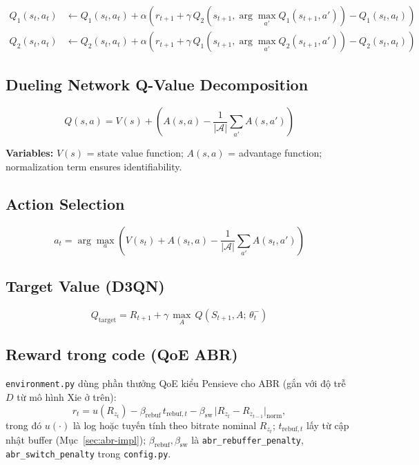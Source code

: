 \documentclass[11pt,a4paper]{article}
\begin{document}
\begin{align}
  Q_1(s_t, a_t) &\leftarrow Q_1(s_t,a_t) + \alpha\!\left(
    r_{t+1} + \gamma\, Q_2\!\left(s_{t+1}, \arg\max_{a'} Q_1(s_{t+1},a')\right)
    - Q_1(s_t,a_t)\right)
  \tag{D3QN-a} \\
  Q_2(s_t, a_t) &\leftarrow Q_2(s_t,a_t) + \alpha\!\left(
    r_{t+1} + \gamma\, Q_1\!\left(s_{t+1}, \arg\max_{a'} Q_2(s_{t+1},a')\right)
    - Q_2(s_t,a_t)\right)
  \tag{D3QN-b}
\end{align}

\subsection{Dueling Network Q-Value Decomposition}

\begin{equation}
  Q(s,a) = V(s) + \left( A(s,a) - \frac{1}{|\mathcal{A}|} \sum_{a'} A(s,a') \right)
  \tag{D3QN-duel}
\end{equation}

\noindent \textbf{Variables:}
$V(s)$ = state value function;
$A(s,a)$ = advantage function;
normalization term ensures identifiability.

\subsection{Action Selection}

\begin{equation}
  a_t = \arg\max_{a}
    \left( V(s_t) + A(s_t,a) - \frac{1}{|\mathcal{A}|}\sum_{a'} A(s_t,a') \right)
  \tag{D3QN-act}
\end{equation}

\subsection{Target Value (D3QN)}

\begin{equation}
  Q_{\mathrm{target}} = R_{t+1} + \gamma\,\max_{A}\,Q(S_{t+1}, A;\,\theta_t^-)
  \tag{D3QN-tgt}
\end{equation}

\subsection{Reward trong code (QoE ABR)}
\label{sec:rl-reward-impl}

\noindent \texttt{environment.py} dùng phần thưởng QoE kiểu Pensieve cho ABR
(gắn với độ trễ $D$ từ mô hình Xie ở trên):
\begin{equation}
  r_t = u(R_{z_t}) - \beta_{\mathrm{rebuf}}\, t_{\mathrm{rebuf},t}
        - \beta_{\mathrm{sw}}\, \bigl| R_{z_t} - R_{z_{t-1}} \bigr|_{\mathrm{norm}},
  \tag{impl-QoE}
\end{equation}
trong đó $u(\cdot)$ là log hoặc tuyến tính theo bitrate nominal $R_{z_t}$;
$t_{\mathrm{rebuf},t}$ lấy từ cập nhật buffer (Mục~\ref{sec:abr-impl});
$\beta_{\mathrm{rebuf}}, \beta_{\mathrm{sw}}$ là \texttt{abr\_rebuffer\_penalty},
\texttt{abr\_switch\_penalty} trong \texttt{config.py}.
\end{document}
